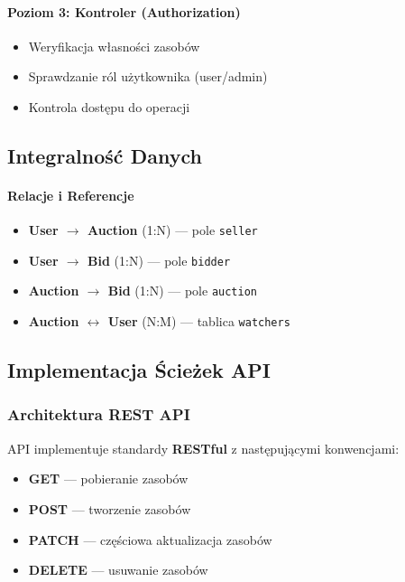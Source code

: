 \paragraph{Poziom 3: Kontroler (Authorization)}
\begin{itemize}
  \item Weryfikacja własności zasobów
  \item Sprawdzanie ról użytkownika (user/admin)
  \item Kontrola dostępu do operacji
\end{itemize}

\subsection{Integralność Danych}

\paragraph{Relacje i Referencje}
\begin{itemize}
  \item \textbf{User $\rightarrow$ Auction} (1:N) --- pole \texttt{seller}
  \item \textbf{User $\rightarrow$ Bid} (1:N) --- pole \texttt{bidder}
  \item \textbf{Auction $\rightarrow$ Bid} (1:N) --- pole \texttt{auction}
  \item \textbf{Auction $\leftrightarrow$ User} (N:M) --- tablica \texttt{watchers}
\end{itemize}

\newpage

\subsection{Implementacja Ścieżek API}

\subsubsection{Architektura REST API}

API implementuje standardy \textbf{RESTful} z następującymi konwencjami:
\begin{itemize}
  \item \textbf{GET} --- pobieranie zasobów
  \item \textbf{POST} --- tworzenie zasobów
  \item \textbf{PATCH} --- częściowa aktualizacja zasobów
  \item \textbf{DELETE} --- usuwanie zasobów
\end{itemize}

